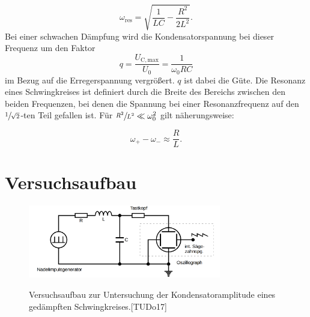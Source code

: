 \documentclass[
  bibliography=totoc,     %
  captions=tableheading,  %
  titlepage=firstiscover, %
]{scrartcl}
\begin{document}
\begin{equation}
    \omega_{\mathup{res}}=\sqrt{\frac{1}{LC}-\frac{R^2}{2L^2}}.
    \label{eq:resonanz}
\end{equation}
Bei einer schwachen Dämpfung wird die Kondensatorspannung bei dieser Frequenz um
den Faktor
\begin{equation}
    q=\frac{U_\mathup{C, max}}{U_0}=\frac{1}{\omega_0RC}
    \label{eq:guete}
\end{equation}
im Bezug auf die Erregerspannung vergrößert. $q$ ist dabei die Güte. Die Resonanz
eines Schwingkreises ist definiert durch die Breite des Bereichs zwischen den
beiden Frequenzen, bei denen die Spannung bei einer Resonanzfrequenz auf den
$\sfrac{1}{\sqrt{2}}$-ten Teil gefallen ist. Für $\sfrac{R^2}{L^2}\ll\omega_0^2$
gilt näherungsweise:

\begin{equation}
    \omega_+-\omega_-\approx\frac{R}{L}.
    \label{eq:breite}
\end{equation}
\newpage
\section{Versuchsaufbau}
\begin{figure}[htb]
  \centering
  \includegraphics[width=0.75\textwidth]{V3543.png}
  \label{V3543}
  \caption{Versuchsaufbau zur Untersuchung der Kondensatoramplitude eines gedämpften Schwingkreises.[TUDo17]}
\end{figure}
\end{document}
